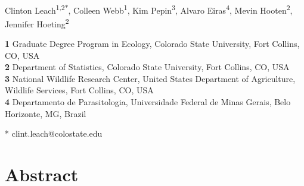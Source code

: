 \documentclass[10pt,letterpaper]{article}
\date{}
\begin{document}
\vspace*{0.2in}

\begin{flushleft}
{\Large
\textbf{}
}
\newline
\\
Clinton Leach\textsuperscript{1,2*},
Colleen Webb\textsuperscript{1},
Kim Pepin\textsuperscript{3},
Alvaro Eiras\textsuperscript{4},
Mevin Hooten\textsuperscript{2},
Jennifer Hoeting\textsuperscript{2}

\bigskip
\textbf{1} Graduate Degree Program in Ecology, Colorado State University, Fort Collins, CO, USA
\\
\textbf{2} Department of Statistics, Colorado State University, Fort Collins, CO, USA
\\
\textbf{3} National Wildlife Research Center, United States Department of Agriculture, Wildlife Services, Fort Collins, CO, USA
\\
\textbf{4} Departamento de Parasitologia, Universidade Federal de Minas Gerais, Belo Horizonte, MG, Brazil
\bigskip

% 


* clint.leach@colostate.edu

\end{flushleft}
\section*{Abstract}
\end{document}
